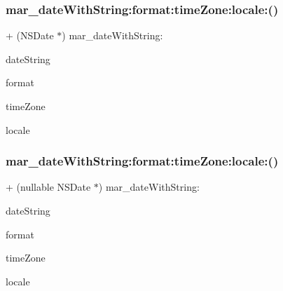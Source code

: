 \subsubsection{\texorpdfstring{mar\+\_\+date\+With\+String\+:format\+:time\+Zone\+:locale\+:()}{mar\_dateWithString:format:timeZone:locale:()}\hspace{0.1cm}{\footnotesize\ttfamily [1/2]}}
{\footnotesize\ttfamily + (N\+S\+Date $\ast$) mar\+\_\+date\+With\+String\+: \begin{DoxyParamCaption}\item[{(N\+S\+String $\ast$)}]{date\+String }\item[{format:(N\+S\+String $\ast$)}]{format }\item[{timeZone:(N\+S\+Time\+Zone $\ast$)}]{time\+Zone }\item[{locale:(N\+S\+Locale $\ast$)}]{locale }\end{DoxyParamCaption}\hspace{0.3cm}{\ttfamily [implementation]}}

\mbox{\label{category_n_s_date_07_m_a_r_e_x_08_a2f95ba56b6d5026130e5fc1c6e67b5e6}} 
\subsubsection{\texorpdfstring{mar\+\_\+date\+With\+String\+:format\+:time\+Zone\+:locale\+:()}{mar\_dateWithString:format:timeZone:locale:()}\hspace{0.1cm}{\footnotesize\ttfamily [2/2]}}
{\footnotesize\ttfamily + (nullable N\+S\+Date $\ast$) mar\+\_\+date\+With\+String\+: \begin{DoxyParamCaption}\item[{(N\+S\+String $\ast$)}]{date\+String }\item[{format:(N\+S\+String $\ast$)}]{format }\item[{timeZone:(nullable N\+S\+Time\+Zone $\ast$)}]{time\+Zone }\item[{locale:(nullable N\+S\+Locale $\ast$)}]{locale }\end{DoxyParamCaption}}

